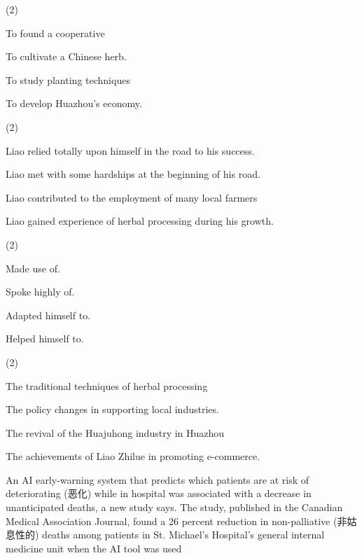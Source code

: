 \documentclass{英语试卷}
\begin{document}
\begin{choices}(2)
  \item To found a cooperative
  \item To cultivate a Chinese herb.
  \item To study planting techniques
  \item To develop Huazhou's economy.
\end{choices}
\begin{choices}(2)
  \item Liao relied totally upon himself in the road to his success.
  \item Liao met with some hardships at the beginning of his road.
  \item Liao contributed to the employment of many local farmers
  \item Liao gained experience of herbal processing during his growth.
\end{choices}
\begin{choices}(2)
  \item Made use of.
  \item Spoke highly of.
  \item Adapted himself to.
  \item Helped himself to.
\end{choices}
\begin{choices}(2)
  \item The traditional techniques of herbal processing
  \item The policy changes in supporting local industries.
  \item The revival of the Huajuhong industry in Huazhou
  \item The achievements of Liao Zhilue in promoting e-commerce.
\end{choices}
\par An AI early-warning system that predicts which patients are at risk of deteriorating (恶化) while in hospital was associated with a decrease in unanticipated deaths, a new study says. The study, published in the Canadian Medical Association Journal, found a 26 percent reduction in non-palliative (非姑息性的) deaths among patients in St. Michael's Hospital's general internal medicine unit when the AI tool was used\par
\end{document}
